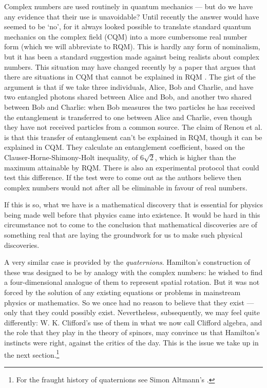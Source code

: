 \documentclass[11pt,oneside,a4paper]{article}
\newcommand*{\sqrtwo}{\ensuremath{\sqrt{2}}\hspace{0.5ex}\xspace}
\begin{document}
Complex numbers are used routinely in quantum mechanics --- but do we have any evidence that their use is unavoidable? Until recently the answer would have seemed to be `no', for it always looked possible to translate standard quantum mechanics on the complex field (CQM) into a more cumbersome real number form (which we will abbreviate to RQM). This is hardly any form of nominalism, but it has been a standard suggestion made against being realists about complex numbers. This situation may have changed recently by a paper that argues that there are situations in CQM that cannot be explained in RQM \parencite{renou_quantum_2021}. The gist of the argument is that if we take three individuals, Alice, Bob and Charlie, and have two entangled photons shared between Alice and Bob, and another two shared between Bob and Charlie: when Bob measures the two particles he has received the entanglement is transferred to one between Alice and Charlie, even though they have not received particles from a common source. The claim of Renou et al. \parencite{renou_quantum_2021} is that this transfer of entanglement can't be explained in RQM, though it can be explained in CQM. They calculate an entanglement coefficient, based on the Clauser-Horne-Shimony-Holt inequality, of 6\sqrtwo, which is higher than the maximum attainable by RQM. There is also an experimental protocol that could test this difference. If the test were to come out as the authors believe then complex numbers would not after all be eliminable in favour of real numbers.

If this is so, what we have is a mathematical discovery that is essential for physics being made well before that physics came into existence. It would be hard in this circumstance not to come to the conclusion that mathematical discoveries are of something real that are laying the groundwork for us to make such physical discoveries.

A very similar case is provided by the \textit{quaternions}. Hamilton's construction of these was designed to be by analogy with the complex numbers: he wished to find a four-dimensional analogue of them to represent spatial rotation. But it was not forced by the solution of any existing equations or problems in mainstream physics or mathematics. So we once had no reason to believe that they exist --- only that they could possibly exist. Nevertheless, subsequently, we may feel quite differently: W. K. Clifford's use of them in what we now call Clifford algebra, and the role that they play in the theory of spinors, may convince us that Hamilton's instincts were right, against the critics of the day. This is the issue we take up in the next section.\footnote{For the fraught history of quaternions see Simon Altmann's \parencite*{altmann_hamilton_1989}.}
\end{document}
